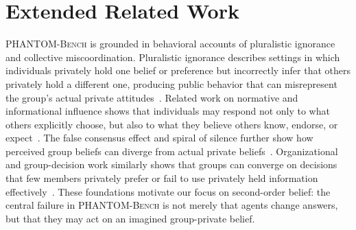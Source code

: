 \documentclass{article}
\begin{document}



\appendix


\section{Extended Related Work}
\label{app:extended-related-work}

\textsc{PHANTOM-Bench} is grounded in behavioral accounts of pluralistic ignorance and collective miscoordination. Pluralistic ignorance describes settings in which individuals privately hold one belief or preference but incorrectly infer that others privately hold a different one, producing public behavior that can misrepresent the group's actual private attitudes~\citep{prentice1993pluralistic,miller2023century}. Related work on normative and informational influence shows that individuals may respond not only to what others explicitly choose, but also to what they believe others know, endorse, or expect~\citep{asch1956studies,deutsch1955normative}. The false consensus effect and spiral of silence further show how perceived group beliefs can diverge from actual private beliefs~\citep{ross1977false,noelleneumann1974spiral}. Organizational and group-decision work similarly shows that groups can converge on decisions that few members privately prefer or fail to use privately held information effectively~\citep{harveyabilene1974,stasser1985unshared,lu2012hiddenprofiles}. These foundations motivate our focus on second-order belief: the central failure in \textsc{PHANTOM-Bench} is not merely that agents change answers, but that they may act on an imagined group-private belief.
\end{document}
